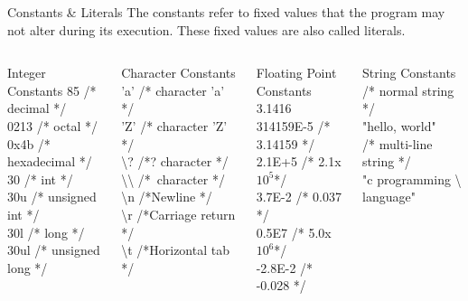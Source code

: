 \documentclass[10pt,t]{beamer}
\begin{document}
\begin{frame}{Constants \& Literals}
  The constants refer to fixed values that the program may not alter during its execution. These fixed values are also called literals.
  \begin{columns}
    \begin{block}{Integer Constants}
    85         /* decimal */\\
    0213       /* octal */\\
    0x4b       /* hexadecimal */\\
    30         /* int */\\
    30u        /* unsigned int */\\
    30l        /* long */\\
    30ul       /* unsigned long */\\
    \end{block}
    \begin{block}{Character Constants}
    'a' /* character 'a' */\\
    'Z' /* character 'Z' */\\
    \textbackslash? /*? character */\\
    \textbackslash{}\textbackslash{} /*\ character */\\
    \textbackslash{}n /*Newline */\\
    \textbackslash{}r /*Carriage return */\\
    \textbackslash{}t /*Horizontal tab */
    \end{block}
    \begin{block}{Floating Point Constants}
    3.1416\\
    314159E-5 /* 3.14159 */\\
    2.1E+5 /* 2.1x$10^5$*/\\
    3.7E-2 /* 0.037 */\\
    0.5E7 /* 5.0x$10^6$*/\\
    -2.8E-2 /* -0.028 */
    \end{block}
    \begin{block}{String Constants}
    /* normal string */\\
    "hello, world"\\
    /* multi-line string */\\
    "c programming \textbackslash{}\\
    language"
    \end{block}
  \end{columns}
\end{frame}
\end{document}
